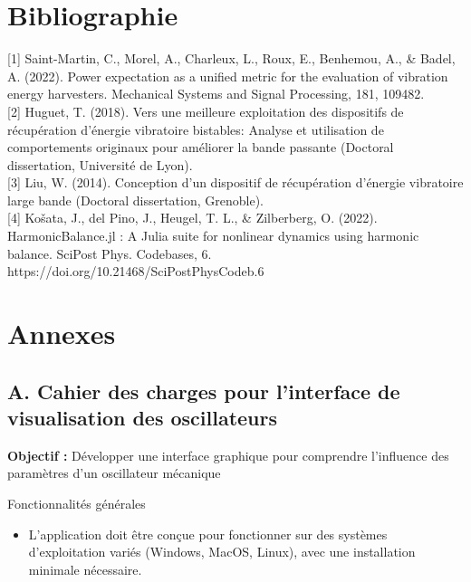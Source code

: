 \documentclass[a4paper, french, 12pt, titlepage]{article}
\begin{document}
\newpage 

\section{Bibliographie}

[1] Saint-Martin, C., Morel, A., Charleux, L., Roux, E., Benhemou, A., \& Badel, A. (2022). Power expectation as a unified metric for the evaluation of vibration energy harvesters. Mechanical Systems and Signal Processing, 181, 109482.\\

[2] Huguet, T. (2018). Vers une meilleure exploitation des dispositifs de récupération d’énergie vibratoire bistables: Analyse et utilisation de comportements originaux pour améliorer la bande passante (Doctoral dissertation, Université de Lyon).\\

[3] Liu, W. (2014). Conception d'un dispositif de récupération d'énergie vibratoire large bande (Doctoral dissertation, Grenoble).\\

[4] Košata, J., del Pino, J., Heugel, T. L., \& Zilberberg, O. (2022). HarmonicBalance.jl : A Julia suite for nonlinear dynamics using harmonic  balance. SciPost Phys. Codebases, 6. https://doi.org/10.21468/SciPostPhysCodeb.6

\newpage

\listoffigures

\newpage

\section{Annexes}

\subsection*{A. Cahier des charges pour l'interface de visualisation des oscillateurs}


\textbf{Objectif :} Développer une interface graphique pour comprendre l'influence des paramètres d'un oscillateur mécanique

\large{Fonctionnalités générales}
\begin{itemize}
\item L'application doit être conçue pour fonctionner sur des systèmes d'exploitation variés (Windows, MacOS, Linux), avec une installation minimale nécessaire.
\end{itemize}
\end{document}

